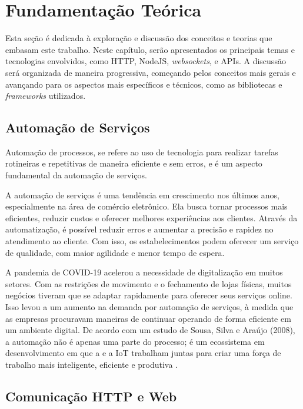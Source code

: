 \chapter{Fundamentação Teórica} \label{cap:fundamentacao}

Esta seção é dedicada à exploração e discussão dos conceitos e teorias que embasam este trabalho. Neste capítulo, serão apresentados os principais temas e tecnologias envolvidos, como HTTP, NodeJS, \textit{websockets}, e APIs. A discussão será organizada de maneira progressiva, começando pelos conceitos mais gerais e avançando para os aspectos mais específicos e técnicos, como as bibliotecas e \textit{frameworks} utilizados.

\section{Automação de Serviços}

Automação de processos, se refere ao uso de tecnologia para realizar tarefas rotineiras e repetitivas de maneira eficiente e sem erros, e é um aspecto fundamental da automação de serviços.

A automação de serviços é uma tendência em crescimento nos últimos anos, especialmente na área de comércio eletrônico. Ela busca tornar processos mais eficientes, reduzir custos e oferecer melhores experiências aos clientes. Através da automatização, é possível reduzir erros e aumentar a precisão e rapidez no atendimento ao cliente. Com isso, os estabelecimentos podem oferecer um serviço de qualidade, com maior agilidade e menor tempo de espera.

A pandemia de COVID-19 acelerou a necessidade de digitalização em muitos setores. Com as restrições de movimento e o fechamento de lojas físicas, muitos negócios tiveram que se adaptar rapidamente para oferecer seus serviços online. Isso levou a um aumento na demanda por automação de serviços, à medida que as empresas procuravam maneiras de continuar operando de forma eficiente em um ambiente digital. De acordo com um estudo de Sousa, Silva e Araújo (2008), a automação não é apenas uma parte do processo; é um ecossistema em desenvolvimento em que a  e a \gls{IoT} trabalham juntas para criar uma força de trabalho mais inteligente, eficiente e produtiva \cite{Gourley2002}.


\section{Comunicação HTTP e Web} \label{sec:http}


